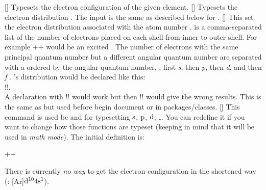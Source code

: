 \documentclass[load-preamble+]{cnltx-doc}
\begin{document}
\begin{commands}
  []
    Typesets the electron configuration of the given element.
  []
    Typesets the electron distribution .  The
    input is the same as described below for .
  []
     This set the electron distribution associated with the atom number
     .   is a comma-separated
     list of the number of electrons placed on each shell from inner to outer
     shell.  For example \verbcode++ would
     be an excited .   The number of electrons with the same
     principal quantum number but a different angular quantum number are
     separated with a \code{+} ordered by the angular quantum number, \ie,
     first \emph{s}, then \emph{p}, then \emph{d}, and then \emph{f} .
     ’s distribution would be declared like this: \\
     \verbcode!!. \\
     A declaration with \verbcode!!
     would work but then \verbcode!! would give the wrong results.
    This is the same as  but used before begin
    document or in packages/classes.
  []
    This command is used be  and
     for typesetting $\printangularmomentum{s}$,
    $\printangularmomentum{p}$, $\printangularmomentum{d}$, \ldots{} You can
    redefine it if you want to change how those functions are typeset (keeping
    in mind that it will be used in \emph{math mode}).  The initial definition
    is:\par
    \verbcode+\newcommand*\printangularmomentum[1]{\mathrm{#1}}+
\end{commands}

\begin{example}
   \par
\end{example}

There is currently \emph{no way} to get the electron configuration in the
shortened way (\eg:
[Ar]$\printangularmomentum{d}^{10}4\printangularmomentum{s}^1$).
\end{document}

